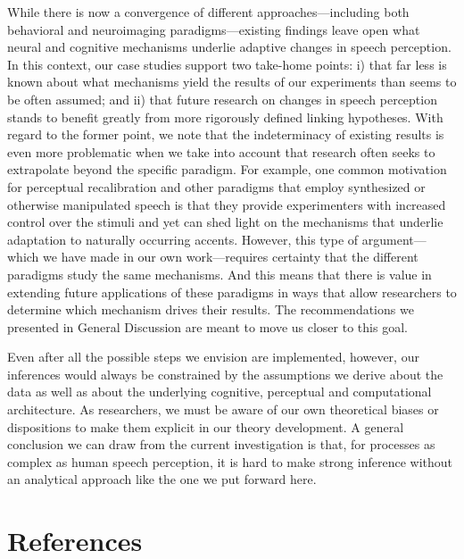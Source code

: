 \documentclass[
  11pt,
  english,
  man,floatsintext]{apa6}
\begin{document}
While there is now a convergence of different approaches---including both behavioral and neuroimaging paradigms---existing findings leave open what neural and cognitive mechanisms underlie adaptive changes in speech perception. In this context, our case studies support two take-home points: i) that far less is known about what mechanisms yield the results of our experiments than seems to be often assumed; and ii) that future research on changes in speech perception stands to benefit greatly from more rigorously defined linking hypotheses. With regard to the former point, we note that the indeterminacy of existing results is even more problematic when we take into account that research often seeks to extrapolate beyond the specific paradigm. For example, one common motivation for perceptual recalibration and other paradigms that employ synthesized or otherwise manipulated speech is that they provide experimenters with increased control over the stimuli and yet can shed light on the mechanisms that underlie adaptation to naturally occurring accents. However, this type of argument---which we have made in our own work---requires certainty that the different paradigms study the same mechanisms. And this means that there is value in extending future applications of these paradigms in ways that allow researchers to determine which mechanism drives their results. The recommendations we presented in General Discussion are meant to move us closer to this goal.

Even after all the possible steps we envision are implemented, however, our inferences would always be constrained by the assumptions we derive about the data as well as about the underlying cognitive, perceptual and computational architecture. As researchers, we must be aware of our own theoretical biases or dispositions to make them explicit in our theory development. A general conclusion we can draw from the current investigation is that, for processes as complex as human speech perception, it is hard to make strong inference without an analytical approach like the one we put forward here.

\newpage

\hypertarget{references}{%
\section{References}\label{references}}

\begingroup
\setlength{\parindent}{-0.5in}
\setlength{\leftskip}{0.5in}
\end{document}
